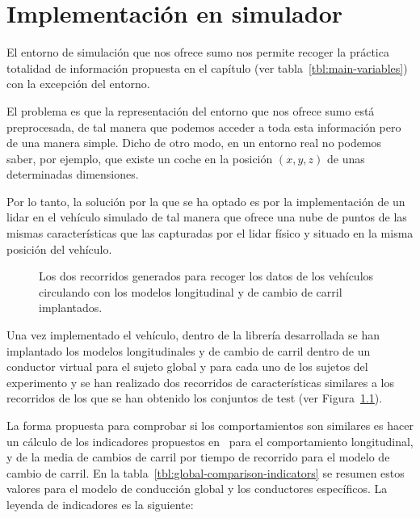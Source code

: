\chapter{Implementación en simulador}
\label{ch:simulation-implementation}

El entorno de simulación que nos ofrece \ac{sumo} nos permite recoger la práctica totalidad de información propuesta en el capítulo  (ver tabla~\ref{tbl:main-variables}) con la excepción del entorno.

El problema es que la representación del entorno que nos ofrece \ac{sumo} está preprocesada, de tal manera que podemos acceder a toda esta información pero de una manera simple. Dicho de otro modo, en un entorno real no podemos saber, por ejemplo, que existe un coche en la posición $(x, y, z)$ de unas determinadas dimensiones.

Por lo tanto, la solución por la que se ha optado es por la implementación de un \ac{lidar} en el vehículo simulado de tal manera que ofrece una nube de puntos de las mismas características que las capturadas por el \ac{lidar} físico y situado en la misma posición del vehículo.

\begin{figure}
	\centering
	\qquad
	\caption[Dos recorridos de prueba en el entorno virtual]{Los dos recorridos generados para recoger los datos de los vehículos circulando con los modelos longitudinal y de cambio de carril implantados.}
	\label{fig:sumo-routes}
\end{figure}

Una vez implementado el vehículo, dentro de la librería desarrollada se han implantado los modelos longitudinales y de cambio de carril dentro de un conductor virtual para el sujeto global y para cada uno de los sujetos del experimento y se han realizado dos recorridos de características similares a los recorridos de los que se han obtenido los conjuntos de test (ver Figura~\ref{fig:sumo-routes}).

La forma propuesta para comprobar si los comportamientos son similares es hacer un cálculo de los indicadores propuestos en~\cite{DiazAlvarez2014} para el comportamiento longitudinal, y de la media de cambios de carril por tiempo de recorrido para el modelo de cambio de carril. En la tabla~\ref{tbl:global-comparison-indicators} se resumen estos valores para el modelo de conducción global y los conductores específicos. La leyenda de indicadores es la siguiente:


